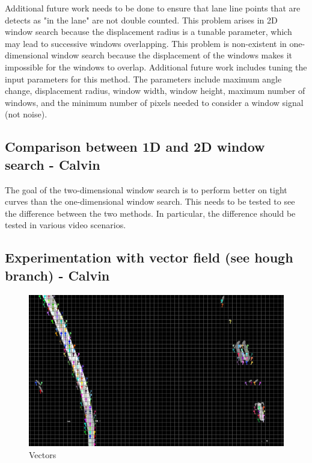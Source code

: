\documentclass[twoside,twocolumn]{article}
\begin{document}
\par Additional future work needs to be done to ensure that lane line points that are detects as "in the lane" are not double counted. This problem arises in 2D window search because the displacement radius is a tunable parameter, which may lead to successive windows overlapping. This problem is non-existent in one-dimensional window search because the displacement of the windows makes it impossible for the windows to overlap. Additional future work includes tuning the input parameters for this method. The parameters include maximum angle change, displacement radius, window width, window height, maximum number of windows, and the minimum number of pixels needed to consider a window signal (not noise).

\subsection{Comparison between 1D and 2D window search - Calvin}
\par The goal of the two-dimensional window search is to perform better on tight curves than the one-dimensional window search. This needs to be tested to see the difference between the two methods. In particular, the difference should be tested in various video scenarios.


\subsection{Experimentation with vector field (see hough branch) - Calvin}
\begin{figure}
  \includegraphics[width=\linewidth]{calvin5.png}
  \caption{Vectors}
  \label{fig:vectors}
\end{figure}
\end{document}

